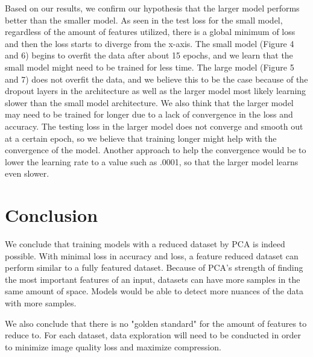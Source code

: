 \documentclass{article}
\begin{document}
Based on our results, we confirm our hypothesis that the larger model performs better than the smaller model. As seen in the test loss for the small model, regardless of the amount of features utilized, there is a global minimum of loss and then the loss starts to diverge from the x-axis. The small model (Figure 4 and 6) begins to overfit the data after about 15 epochs, and we learn that the small model might need to be trained for less time. The large model (Figure 5 and 7) does not overfit the data, and we believe this to be the case because of the dropout layers in the architecture as well as the larger model most likely learning slower than the small model architecture. We also think that the larger model may need to be trained for longer due to a lack of convergence in the loss and accuracy. The testing loss in the larger model does not converge and smooth out at a certain epoch, so we believe that training longer might help with the convergence of the model. Another approach to help the convergence would be to lower the learning rate to a value such as .0001, so that the larger model learns even slower.

\section{Conclusion}

We conclude that training models with a reduced dataset by PCA is indeed possible. With minimal loss in accuracy and loss, a feature reduced dataset can perform similar to a fully featured dataset. Because of PCA's strength of finding the most important features of an input, datasets can have more samples in the same amount of space. Models would be able to detect more nuances of the data with more samples. 

We also conclude that there is no "golden standard" for the amount of features to reduce to. For each dataset, data exploration will need to be conducted in order to minimize image quality loss and maximize compression.
\end{document}
